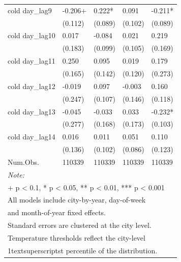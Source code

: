 \begin{table}
{\begin{tabular}[t]{lllll}
cold day_{lag9} & -0.206+ & 0.222* & 0.091 & -0.211*\\

 & (0.112) & (0.089) & (0.102) & (0.089)\\

cold day_{lag10} & 0.017 & -0.084 & 0.021 & 0.219\\

 & (0.183) & (0.099) & (0.105) & (0.169)\\

cold day_{lag11} & 0.250 & 0.095 & 0.019 & 0.179\\

 & (0.165) & (0.142) & (0.120) & (0.273)\\

cold day_{lag12} & -0.019 & 0.097 & -0.003 & 0.160\\

 & (0.247) & (0.107) & (0.146) & (0.118)\\

cold day_{lag13} & -0.045 & -0.033 & 0.033 & -0.232*\\

 & (0.277) & (0.168) & (0.173) & (0.103)\\

cold day_{lag14} & 0.016 & 0.011 & 0.051 & 0.110\\

 & (0.136) & (0.102) & (0.086) & (0.123)\\

Num.Obs. & 110339 & 110339 & 110339 & 110339\\
\bottomrule
\multicolumn{5}{l}{\rule{0pt}{1em}\textit{Note: }}\\
\multicolumn{5}{l}{\rule{0pt}{1em}+ p < 0.1, * p < 0.05, ** p < 0.01, *** p < 0.001}\\
\multicolumn{5}{l}{\rule{0pt}{1em}All models include city-by-year, day-of-week}\\
\multicolumn{5}{l}{\rule{0pt}{1em}and month-of-year fixed effects.}\\
\multicolumn{5}{l}{\rule{0pt}{1em}Standard errors are clustered at the city level.}\\
\multicolumn{5}{l}{\rule{0pt}{1em}Temperature thresholds reflect the city-level}\\
\multicolumn{5}{l}{\rule{0pt}{1em}1textsuperscript{st} percentile of the distribution.}\\
\end{tabular}}
\end{table}
